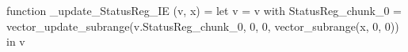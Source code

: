function _update_StatusReg_IE (v, x) = let v = { v with StatusReg_chunk_0 = vector_update_subrange(v.StatusReg_chunk_0, 0, 0, vector_subrange(x, 0, 0)) } in v
